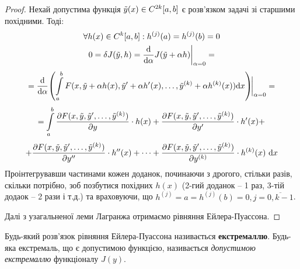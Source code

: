 \documentclass[14pt,a4paper]{scrartcl}
\theoremstyle{definition}
\theoremstyle{definition}
\theoremstyle{definition}
\begin{document}
\begin{proof}
   Нехай допустима функція $\tilde{y} (x) \in C^{2k} [a,b]$ є розв'язком задачі зі старшими похідними. Тоді:
   $$
\begin{gathered}
\forall h(x) \in C^{k}[a,b] : h^{(j)} (a)  = h^{(j)}(b) = 0 \\
0 = \delta J(\tilde{y}, h) = \frac{\mathrm{d}}{\mathrm{d} \alpha} J(\tilde{y} + \alpha h)\bigg|_{\alpha = 0} =
\end{gathered}
   $$
   $$
   = \frac{\mathrm{d}}{\mathrm{d} \alpha }\!  \left(   \int\limits_{a}^{b}{
   F(x,\tilde{y} + \alpha h(x) , \tilde{y}' + \alpha h'(x),\dots,
\tilde{y}^{(k)} + \alpha h^{(k)} (x)
    ) \mathrm{d} x
   } \right)\!\!\bigg|_{\alpha = 0} =
   $$
   $$
    = \int\limits_{a}^{b}{
    \frac{\partial F(x,\tilde{y}, \tilde{y}', \dots, \tilde{y}^{(k)})}{\partial y} \cdot h(x) +  \frac{\partial F(x,\tilde{y}, \tilde{y}', \dots, \tilde{y}^{(k)})}{\partial y'} \cdot h'(x) +
    }
   $$
   $$
   + \frac{\partial F(x,\tilde{y}, \tilde{y}', \dots, \tilde{y}^{(k)})}{\partial y''} \cdot h''(x) + \dots + \frac{\partial F(x,\tilde{y}, \tilde{y}', \dots, \tilde{y}^{(k)})}{\partial y^{(k)}} \cdot h^{(k)}(x) \  \mathrm{d} x
   $$
   Проінтегрувавши частинами кожен доданок, починаючи з дрогого, стільки разів, скільки потрібно, зоб позбутися похідних $h(x)$ (2-гий доданок -- 1 раз, 3-тій додаок -- 2 рази і т.д.) та враховуючи, що $h^{(j)} = a = h^{(j)} (b) = 0, j = \overline{0, k-1}$. \par Далі з узагальненої леми Лагранжа отримаємо рівняння Ейлера-Пуассона.
\end{proof}
Будь-який розв'язок рівняння Ейлера-Пуассона називається \textbf{екстремаллю}. Будь-яка екстремаль, що є допустимою функцією, називається \textit{допустимою екстремаллю} функціоналу $J(y)$.
\end{document}
